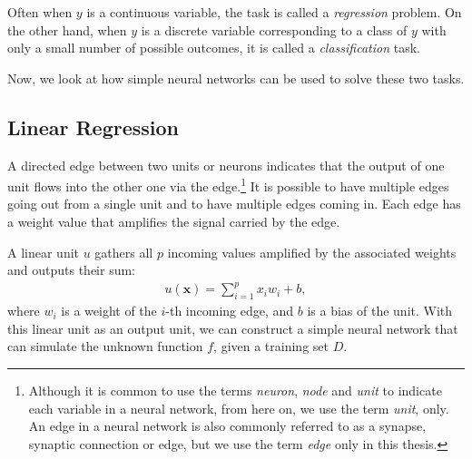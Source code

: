 \documentclass{now}
\newcommand{\vect}[1]{\mathbf{#1}}
\newcommand{\vx}[0]{\vect{x}}
\begin{document}
Often when $y$ is a continuous variable, the task is called a
\textit{regression} problem.  On the other hand, when $y$ is a discrete
variable corresponding to a class of $y$ with only a small number of possible
outcomes, it is called a \textit{classification} task.

Now, we look at how simple neural networks can be used to solve these two
tasks.

\subsection{Linear Regression}
\label{sec:linear_regression}

A directed edge between two units or neurons indicates that the output of one
unit flows into the other one via the edge.\footnote{
    Although it is common to use the terms \textit{neuron}, \textit{node} and
    \textit{unit} to indicate each variable in a neural network, from here on,
    we use the term \textit{unit}, only. An edge in a neural network is also
    commonly referred to as a synapse, synaptic connection or edge, but we use
    the term \textit{edge} only in this thesis.
}
It is possible to have multiple edges going out from a single unit and to have
multiple edges coming in.  Each edge has a weight value that amplifies the
signal carried by the edge.

A linear unit $u$ gathers all $p$ incoming values amplified by the associated
weights and outputs their sum:
\begin{align}
    \label{eq:linear_unit}
    u(\vx) = \sum_{i=1}^p x_i w_i + b, 
\end{align}
where $w_i$ is a weight of the $i$-th incoming edge, and $b$ is a bias of the
unit.  With this linear unit as an output unit, we can construct a simple
neural network that can simulate the unknown function $f$, given a training set
$D$. 
\end{document}
